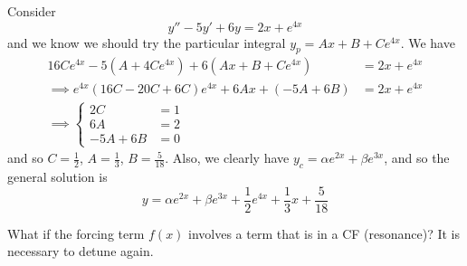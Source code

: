 \documentclass{../template/note}
\begin{document}
    \begin{example}
        Consider
        \[
            y'' - 5y' + 6y = 2x + e^{4x}
        \]
        and we know we should try the particular integral \(y_p = Ax + B + Ce^{4x}\). We have
        \begin{align*}
            16Ce^{4x} - 5(A + 4Ce^{4x}) + 6(Ax + B + Ce^{4x}) &= 2x + e^{4x} \\
            \implies e^{4x}(16C - 20C + 6C)e^{4x} + 6Ax + (-5A + 6B) &= 2x + e^{4x} \\
            \implies \begin{cases}
                2C &= 1 \\
                6A &= 2 \\
                -5A + 6B &= 0
            \end{cases} \qquad
        \end{align*}
        and so \(C = \frac{1}{2}\), \(A = \frac{1}{3}\), \(B = \frac{5}{18}\). Also, we clearly have \(y_c = \alpha e^{2x} + \beta e^{3x}\), and so the general solution is
        \[
            y = \alpha e^{2x} + \beta e^{3x} + \frac{1}{2}e^{4x} + \frac{1}{3} x + \frac{5}{18}
        \]
    \end{example}
    
    What if the forcing term \(f(x)\) involves a term that is in a CF (resonance)? It is necessary to detune again.
\end{document}

